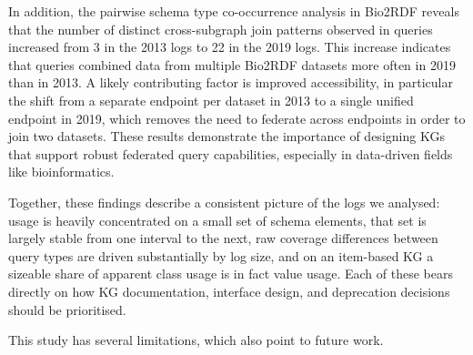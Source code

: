 \documentclass[sw]{iosart2x}
\begin{document}

In addition, the pairwise schema type co-occurrence analysis in Bio2RDF reveals that the number of distinct cross-subgraph join patterns observed in queries increased from 3 in the 2013 logs to 22 in the 2019 logs. This increase indicates that queries combined data from multiple Bio2RDF datasets more often in 2019 than in 2013. A likely contributing factor is improved accessibility, in particular the shift from a separate endpoint per dataset in 2013 to a single unified endpoint in 2019, which removes the need to federate across endpoints in order to join two datasets. These results demonstrate the importance of designing KGs that support robust federated query capabilities, especially in data-driven fields like bioinformatics.

Together, these findings describe a consistent picture of the logs we analysed: usage is heavily concentrated on a small set of schema elements, that set is largely stable from one interval to the next, raw coverage differences between query types are driven substantially by log size, and on an item-based KG a sizeable share of apparent class usage is in fact value usage. Each of these bears directly on how KG documentation, interface design, and deprecation decisions should be prioritised.

This study has several limitations, which also point to future work.
\end{document}
